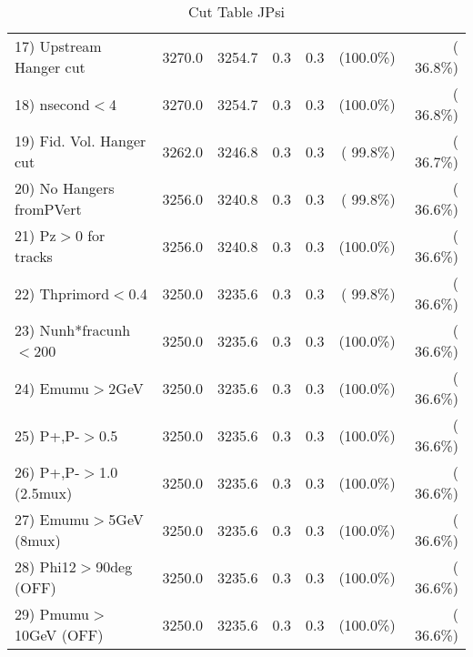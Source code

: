 \begin{table}[h!]
\begin{tabular}{||l||r|r|r|r|r|r||}
 17) Upstream Hanger cut  &       3270.0 &       3254.7 &          0.3 &          0.3 & (100.0\%) & ( 36.8\%) \\
 18) nsecond$<$4          &       3270.0 &       3254.7 &          0.3 &          0.3 & (100.0\%) & ( 36.8\%) \\
 19) Fid. Vol. Hanger cut &       3262.0 &       3246.8 &          0.3 &          0.3 & ( 99.8\%) & ( 36.7\%) \\
 20) No Hangers fromPVert &       3256.0 &       3240.8 &          0.3 &          0.3 & ( 99.8\%) & ( 36.6\%) \\
 21) Pz$>$0 for tracks    &       3256.0 &       3240.8 &          0.3 &          0.3 & (100.0\%) & ( 36.6\%) \\
 22) Thprimord$<$0.4      &       3250.0 &       3235.6 &          0.3 &          0.3 & ( 99.8\%) & ( 36.6\%) \\
 23) Nunh*fracunh$<$200   &       3250.0 &       3235.6 &          0.3 &          0.3 & (100.0\%) & ( 36.6\%) \\
 24) Emumu$>$2GeV         &       3250.0 &       3235.6 &          0.3 &          0.3 & (100.0\%) & ( 36.6\%) \\
 25) P+,P-$>$0.5          &       3250.0 &       3235.6 &          0.3 &          0.3 & (100.0\%) & ( 36.6\%) \\
 26) P+,P-$>$1.0 (2.5mux) &       3250.0 &       3235.6 &          0.3 &          0.3 & (100.0\%) & ( 36.6\%) \\
 27) Emumu$>$5GeV  (8mux) &       3250.0 &       3235.6 &          0.3 &          0.3 & (100.0\%) & ( 36.6\%) \\
 28) Phi12$>$90deg  (OFF) &       3250.0 &       3235.6 &          0.3 &          0.3 & (100.0\%) & ( 36.6\%) \\
 29) Pmumu$>$10GeV  (OFF) &       3250.0 &       3235.6 &          0.3 &          0.3 & (100.0\%) & ( 36.6\%) \\
 \hline
 \hline
 \end{tabular}
 \caption{Cut Table  JPsi     }
 \label{tab-cutcohjpsi-mumu_jpsi}
 \end{table}
